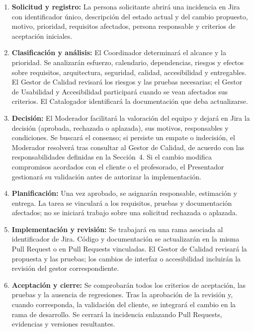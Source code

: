\begin{enumerate}[leftmargin=*]
  \item \textbf{Solicitud y registro:} La persona solicitante abrirá una incidencia en Jira con identificador único, descripción del estado actual y del cambio propuesto, motivo, prioridad, requisitos afectados, persona responsable y criterios de aceptación iniciales.
  \item \textbf{Clasificación y análisis:} El Coordinador determinará el alcance y la prioridad. Se analizarán esfuerzo, calendario, dependencias, riesgos y efectos sobre requisitos, arquitectura, seguridad, calidad, accesibilidad y entregables. El Gestor de Calidad revisará los riesgos y las pruebas necesarias; el Gestor de Usabilidad y Accesibilidad participará cuando se vean afectados sus criterios. El Catalogador identificará la documentación que deba actualizarse.
  \item \textbf{Decisión:} El Moderador facilitará la valoración del equipo y dejará en Jira la decisión (aprobada, rechazada o aplazada), sus motivos, responsables y condiciones. Se buscará el consenso; si persiste un empate o indecisión, el Moderador resolverá tras consultar al Gestor de Calidad, de acuerdo con las responsabilidades definidas en la Sección~4. Si el cambio modifica compromisos acordados con el cliente o el profesorado, el Presentador gestionará su validación antes de autorizar la implementación.
  \item \textbf{Planificación:} Una vez aprobado, se asignarán responsable, estimación y entrega. La tarea se vinculará a los requisitos, pruebas y documentación afectados; no se iniciará trabajo sobre una solicitud rechazada o aplazada.
  \item \textbf{Implementación y revisión:} Se trabajará en una rama asociada al identificador de Jira. Código y documentación se actualizarán en la misma Pull Request o en Pull Requests vinculadas. El Gestor de Calidad revisará la propuesta y las pruebas; los cambios de interfaz o accesibilidad incluirán la revisión del gestor correspondiente.
  \item \textbf{Aceptación y cierre:} Se comprobarán todos los criterios de aceptación, las pruebas y la ausencia de regresiones. Tras la aprobación de la revisión y, cuando corresponda, la validación del cliente, se integrará el cambio en la rama de desarrollo. Se cerrará la incidencia enlazando Pull Requests, evidencias y versiones resultantes.
\end{enumerate}

